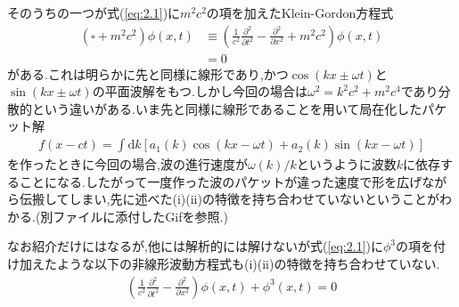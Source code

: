 \documentclass[dvipdfmx,11pt,a4paper,oneside,openany]{jsbook}
\begin{document}
そのうちの一つが式(\ref{eq:2.1})に$m^2c^2$の項を加えたKlein-Gordon方程式
\begin{align}
    \left(\square+m^{2} c^{2}\right) \phi(x, t) & \equiv\left(\frac{1}{c^{2}} \frac{\partial^{2}}{\partial t^{2}}-\frac{\partial^{2}}{\partial x^{2}}+m^{2} c^{2}\right) \phi(x, t)\nonumber \\
                                                & =0
\end{align}
がある.これは明らかに先と同様に線形であり,かつ$\cos(kx\pm \omega t)$と$\sin(kx\pm \omega t)$の平面波解をもつ.しかし今回の場合は$\omega^2=k^2c^2+m^2c^4$であり分散的という違いがある.いま先と同様に線形であることを用いて局在化したパケット解
\begin{align*}
    f(x-ct)=\int \mathrm{d} k\left[a_{1}(k) \cos (k x-\omega t)+a_{2}(k) \sin (k x-\omega t)\right]
\end{align*}
を作ったときに今回の場合,波の進行速度が$\omega(k)/k$というように波数$k$に依存することになる.したがって一度作った波のパケットが違った速度で形を広げながら伝搬してしまい,先に述べた(i)(ii)の特徴を持ち合わせていないということがわかる.(別ファイルに添付したGifを参照.)
\begin{figure}[H]
    \centering
    \label{wave(spread)}
\end{figure}
なお紹介だけにはなるが,他には解析的には解けないが式(\ref{eq:2.1})に$\phi^3$の項を付け加えたような以下の非線形波動方程式も(i)(ii)の特徴を持ち合わせていない.
\begin{align}
    \left(\frac{1}{c^{2}} \frac{\partial^{2}}{\partial t^{2}}-\frac{\partial^{2}}{\partial x^{2}}\right) \phi(x, t)+\phi^{3}(x, t)=0\label{eq:2.4}
\end{align}
\end{document}
